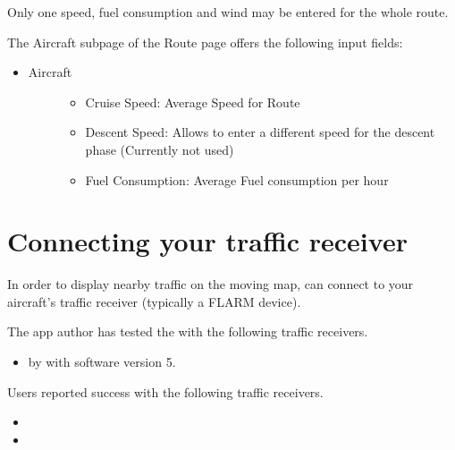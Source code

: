 \documentclass[letterpaper,10pt,english]{sphinxmanual}
\begin{document}
\sphinxAtStartPar
Only one speed, fuel consumption and wind may be entered for the whole route.

\sphinxAtStartPar
The Aircraft sub\sphinxhyphen{}page of the Route page offers the following input fields:
\begin{itemize}
\item {} \begin{description}
\item[{Aircraft}] \leavevmode\begin{itemize}
\item {} 
\sphinxAtStartPar
Cruise Speed: Average Speed for Route

\item {} 
\sphinxAtStartPar
Descent Speed: Allows to enter a different speed for the descent phase (Currently not used)

\item {} 
\sphinxAtStartPar
Fuel Consumption: Average Fuel consumption per hour

\end{itemize}

\end{description}

\end{itemize}


\chapter{Connecting your traffic receiver}
\label{\detokenize{02-steps/traffic:connecting-your-traffic-receiver}}\label{\detokenize{02-steps/traffic::doc}}
\sphinxAtStartPar
In order to display nearby traffic on the moving map,  can connect to your aircraft’s traffic receiver (typically a FLARM
device).

\sphinxAtStartPar
The app author has tested the  with the following
traffic receivers.
\begin{itemize}
\item {} 
\sphinxAtStartPar
{} by  with software version 5.

\end{itemize}

\sphinxAtStartPar
Users reported success with the following traffic receivers.
\begin{itemize}
\item {} 
\sphinxAtStartPar
{}

\item {} 
\sphinxAtStartPar
{}

\end{itemize}
\end{document}
